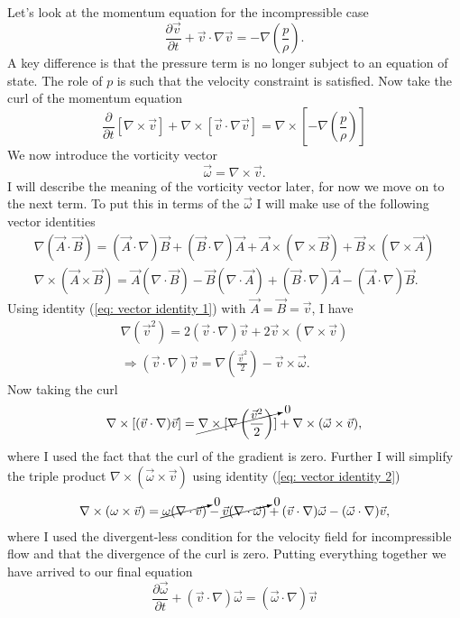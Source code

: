 \documentclass{article}
\begin{document}
Let's look at the momentum equation for the incompressible case
\begin{equation}
\frac{\partial \vec{v}}{\partial t} + \vec{v}\cdot\nabla\vec{v} = -\nabla \left(\frac{p}{\rho}\right).
\end{equation}
A key difference is that the pressure term is no longer subject to an equation of state. The role of $p$ is such that
the velocity constraint is satisfied. Now take the curl of the momentum equation
\begin{equation}
\frac{\partial}{\partial t}\left[\nabla\times\vec{v}\right] + \nabla\times\left[\vec{v}\cdot\nabla\vec{v}\right] =\nabla\times\left[-\nabla\left(\frac{p}{\rho}\right)\right]
\end{equation}
We now introduce the vorticity vector
\begin{equation}
\vec{\omega} = \nabla\times\vec{v}.
\end{equation}
I will describe the meaning of the vorticity vector later, for now we move on to the next term. To put this in terms of the $\vec{\omega}$ I will make use of the following vector identities
\begin{gather}
\label{eq: vector identity 1}
\nabla(\vec{A}\cdot\vec{B}) = (\vec{A}\cdot\nabla)\vec{B} + (\vec{B}\cdot\nabla)\vec{A} + \vec{A}\times(\nabla\times\vec{B}) + \vec{B}\times(\nabla\times\vec{A})\\
\label{eq: vector identity 2}
\nabla\times(\vec{A}\times\vec{B}) = \vec{A}(\nabla\cdot\vec{B})-\vec{B}(\nabla\cdot\vec{A}) + (\vec{B}\cdot\nabla)\vec{A}-(\vec{A}\cdot\nabla)\vec{B}.
\end{gather}
Using identity (\ref{eq: vector identity 1}) with $\vec{A} = \vec{B} = \vec{v}$, I have
\begin{gather*}
\nabla(\vec{v}^2) = 2(\vec{v}\cdot\nabla)\vec{v} + 2\vec{v}\times(\nabla\times\vec{v})\\
\Rightarrow (\vec{v}\cdot\nabla)\vec{v} = \nabla \left(\frac{\vec{v}^2}{2}\right) - \vec{v}\times\vec{\omega}.
\end{gather*}
Now taking the curl
\begin{align*}
\nabla\times[(\vec{v}\cdot\nabla)\vec{v}] = \cancelto{0}{\nabla\times[\nabla\left(\frac{\vec{v}^2}{2}\right)]} + \nabla\times(\vec{\omega}\times\vec{v}),
\end{align*}
where I used the fact that the curl of the gradient is zero. Further I will simplify the triple product $\nabla\times(\vec{\omega}\times\vec{v})$ using identity (\ref{eq: vector identity 2})
\begin{gather*}
\nabla\times(\omega\times\vec{v}) = \cancelto{0}{\omega(\nabla\cdot\vec{v})} - \cancelto{0}{\vec{v}(\nabla\cdot\vec{\omega})} + (\vec{v}\cdot\nabla)\vec{\omega} - (\vec{\omega}\cdot\nabla)\vec{v},
\end{gather*}
where I used the divergent-less condition for the velocity field for incompressible flow and that the divergence of the curl is zero. Putting everything together we have arrived to our final equation
\begin{equation}
\label{eq: vorticity evolution}
\frac{\partial\vec{\omega}}{\partial t} + (\vec{v}\cdot\nabla)\vec{\omega} = (\vec{\omega}\cdot\nabla)\vec{v}
\end{equation}
\end{document}
